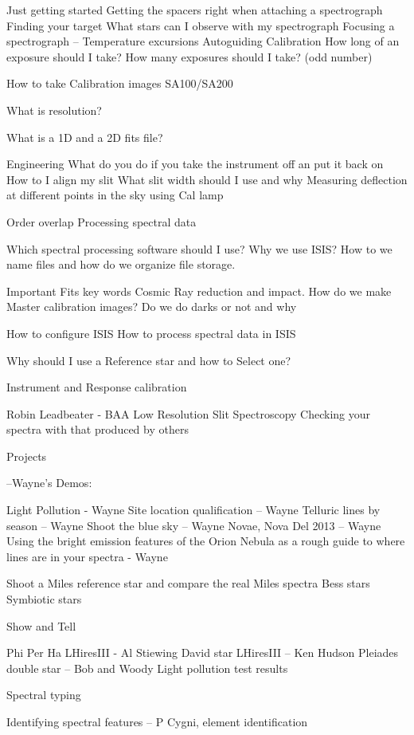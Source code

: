 Just getting started 
  Getting the spacers right when attaching a spectrograph
  Finding your target
  What stars can I observe with my spectrograph
  Focusing a spectrograph – Temperature excursions
  Autoguiding
  Calibration
  How long of an exposure should I take?
  How many exposures should I take? (odd number)

How to take Calibration images
  SA100/SA200

What is resolution?

What is a 1D and a 2D fits file? 

Engineering 
  What do you do if you take the instrument off an put it back on
  How to I align my slit
  What slit width should I use and why
  Measuring deflection at different points in the sky using Cal lamp

Order overlap
  Processing spectral data 

Which spectral processing software should I use?  
  Why we use ISIS?
  How to we name files and how do we organize file storage.

Important Fits key words
  Cosmic Ray reduction and impact.
  How do we make Master calibration images?
  Do we do darks or not and why

How to configure ISIS
  How to process spectral data in ISIS

Why should I use a Reference star and how to Select one?

Instrument and Response calibration

Robin Leadbeater - BAA Low Resolution Slit Spectroscopy
Checking your spectra with that produced by others

 Projects

--Wayne's Demos:

   Light Pollution - Wayne
   Site location qualification – Wayne
   Telluric lines by season – Wayne
   Shoot the blue sky – Wayne
   Novae, Nova Del 2013 – Wayne
   Using the bright emission features of the Orion Nebula as a rough
   guide to where lines are in your spectra - Wayne

Shoot a Miles reference star and compare the real Miles spectra
Bess stars
Symbiotic stars


Show and Tell


Phi Per Ha LHiresIII  - Al Stiewing
David star LHiresIII – Ken Hudson
Pleiades double star – Bob and Woody
Light pollution test results

Spectral typing

Identifying spectral features – P Cygni, element identification

